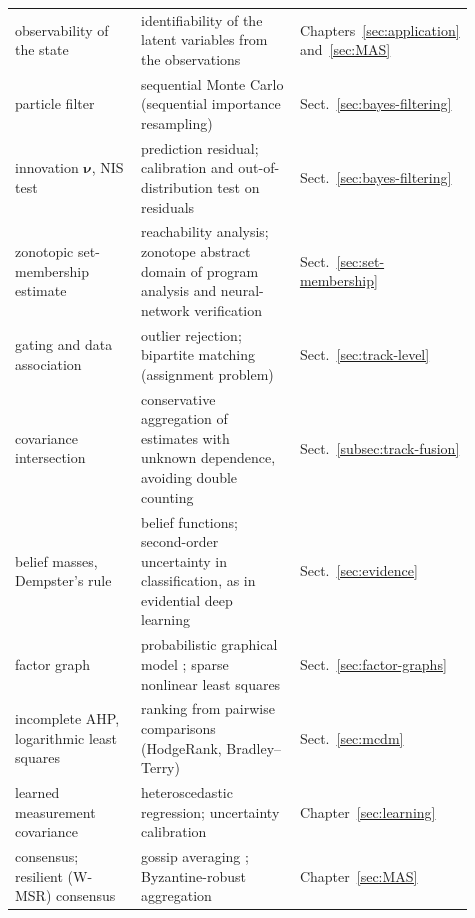 \begin{table}[!t]
\begin{tabular}{>{\raggedright\arraybackslash}p{0.33\linewidth} >{\raggedright\arraybackslash}p{0.44\linewidth} >{\raggedright\arraybackslash}p{0.14\linewidth}}
       observability of the state & identifiability of the latent variables from the observations & Chapters~\ref{sec:application} and~\ref{sec:MAS} \\
        particle filter & sequential Monte Carlo (sequential importance resampling) & Sect.~\ref{sec:bayes-filtering} \\
        innovation $\boldsymbol{\nu}$, NIS test & prediction residual; calibration and out-of-distribution test on residuals & Sect.~\ref{sec:bayes-filtering} \\
        zonotopic set-membership estimate & reachability analysis; zonotope abstract domain of program analysis and neural-network verification & Sect.~\ref{sec:set-membership} \\
        gating and data association & outlier rejection; bipartite matching (assignment problem) & Sect.~\ref{sec:track-level} \\
        covariance intersection & conservative aggregation of estimates with unknown dependence, avoiding double counting & Sect.~\ref{subsec:track-fusion} \\
        belief masses, Dempster's rule & belief functions; second-order uncertainty in classification, as in evidential deep learning \cite{sensoy2018_edl} & Sect.~\ref{sec:evidence} \\
        factor graph & probabilistic graphical model \cite{kschischang2001_factor}; sparse nonlinear least squares & Sect.~\ref{sec:factor-graphs} \\
        incomplete AHP, logarithmic least squares & ranking from pairwise comparisons (HodgeRank, Bradley--Terry) & Sect.~\ref{sec:mcdm} \\
        learned measurement covariance & heteroscedastic regression; uncertainty calibration & Chapter~\ref{sec:learning} \\
        consensus; resilient (W-MSR) consensus & gossip averaging \cite{boyd2006_gossip}; Byzantine-robust aggregation & Chapter~\ref{sec:MAS} \\
        \hline
    \end{tabular}
\end{table}






